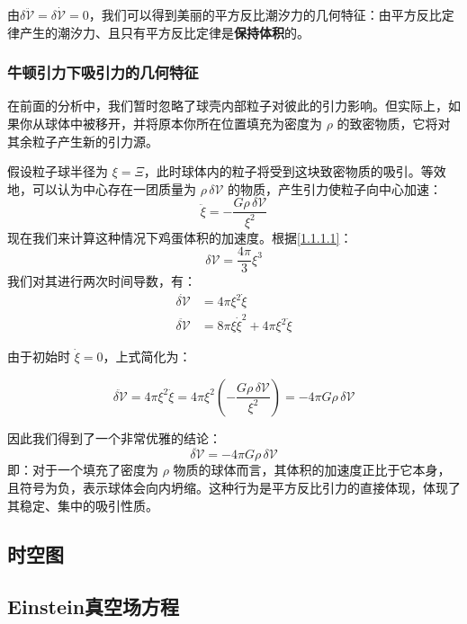 \documentclass{article}
\begin{document}
由$\delta\ddot{\mathcal V}=\delta\dot{\mathcal V}=0$，我们可以得到美丽的平方反比潮汐力的几何特征：由平方反比定律产生的潮汐力、且只有平方反比定律是\textbf{保持体积}的。

\subsubsection{牛顿引力下吸引力的几何特征}

在前面的分析中，我们暂时忽略了球壳内部粒子对彼此的引力影响。但实际上，如果你从球体中被移开，并将原本你所在位置填充为密度为 $\rho$ 的致密物质，它将对其余粒子产生新的引力源。

假设粒子球半径为 $\xi = \Xi$，此时球体内的粒子将受到这块致密物质的吸引。等效地，可以认为中心存在一团质量为 $\rho \, \delta \mathcal{V}$ 的物质，产生引力使粒子向中心加速：
\begin{equation*}
\ddot{\xi} = -\frac{G \rho \, \delta \mathcal{V}}{\xi^2}
\end{equation*}
现在我们来计算这种情况下鸡蛋体积的加速度。根据\eqref{1.1.1.1}：
\begin{equation*}
\delta \mathcal{V} = \frac{4\pi}{3} \xi^3
\end{equation*}
我们对其进行两次时间导数，有：
\begin{align*}
\dot{\delta \mathcal{V}} &= 4\pi \xi^2 \dot{\xi} \\
\ddot{\delta \mathcal{V}} &= 8\pi \xi \dot{\xi}^2 + 4\pi \xi^2 \ddot{\xi}
\end{align*}

由于初始时 $\dot{\xi} = 0$，上式简化为：

\begin{equation*}
\ddot{\delta \mathcal{V}} = 4\pi \xi^2 \ddot{\xi} = 4\pi \xi^2 \left( -\frac{G \rho \, \delta \mathcal{V}}{\xi^2} \right) = -4\pi G \rho \, \delta \mathcal{V}
\end{equation*}

因此我们得到了一个非常优雅的结论：
\begin{equation}
    \ddot{\delta \mathcal{V}} = -4\pi G \rho \, \delta \mathcal{V}
\end{equation}
即：对于一个填充了密度为 $\rho$ 物质的球体而言，其体积的加速度正比于它本身，且符号为负，表示球体会向内坍缩。这种行为是平方反比引力的直接体现，体现了其稳定、集中的吸引性质。
\subsection{时空图}

\subsection{Einstein真空场方程}
\end{document}
